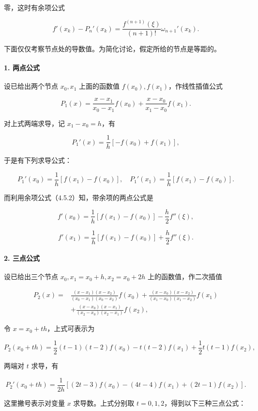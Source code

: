 零，这时有余项公式

\[
f'(x_k)-P_n'(x_k)=\frac{f^{(n+1)}(\xi)}{(n+1)!}\omega_{n+1}'(x_k).
\tag{4.5.2}
\]

下面仅仅考察节点处的导数值。为简化讨论，假定所给的节点是等距的。

\paragraph{1. 两点公式}\label{ch04b-ux4e24ux70b9ux516cux5f0f}

设已给出两个节点 \(x_0,x_1\) 上面的函数值 \(f(x_0),f(x_1)\)，作线性插值公式

\[
P_1(x)=\frac{x-x_1}{x_0-x_1}f(x_0)+\frac{x-x_0}{x_1-x_0}f(x_1).
\]

对上式两端求导，记 \(x_1-x_0=h\)，有

\[
P_1'(x)=\frac1h[-f(x_0)+f(x_1)],
\]

于是有下列求导公式：

\[
P_1'(x_0)=\frac1h[f(x_1)-f(x_0)],\quad
P_1'(x_1)=\frac1h[f(x_1)-f(x_0)].
\]

而利用余项公式（4.5.2）知，带余项的两点公式是

\[
f'(x_0)=\frac1h[f(x_1)-f(x_0)]-\frac h2f''(\xi),
\]

\[
f'(x_1)=\frac1h[f(x_1)-f(x_0)]+\frac h2f''(\xi).
\]

\paragraph{2. 三点公式}\label{ch04b-ux4e09ux70b9ux516cux5f0f}

设已给出三个节点 \(x_0,x_1=x_0+h,x_2=x_0+2h\) 上的函数值，作二次插值

\[
\begin{aligned}
P_2(x)={}&\frac{(x-x_1)(x-x_2)}{(x_0-x_1)(x_0-x_2)}f(x_0)
+\frac{(x-x_0)(x-x_2)}{(x_1-x_0)(x_1-x_2)}f(x_1)\\
&+\frac{(x-x_0)(x-x_1)}{(x_2-x_0)(x_2-x_1)}f(x_2),
\end{aligned}
\]

令 \(x=x_0+th\)，上式可表示为

\[
P_2(x_0+th)=\frac12(t-1)(t-2)f(x_0)-t(t-2)f(x_1)
+\frac12t(t-1)f(x_2),
\]

两端对 \(t\) 求导，有

\[
P_2'(x_0+th)=\frac1{2h}[(2t-3)f(x_0)-(4t-4)f(x_1)+(2t-1)f(x_2)].
\tag{4.5.3}
\]

这里撇号表示对变量 \(x\) 求导数。上式分别取 \(t=0,1,2\)，得到以下三种三点公式：

